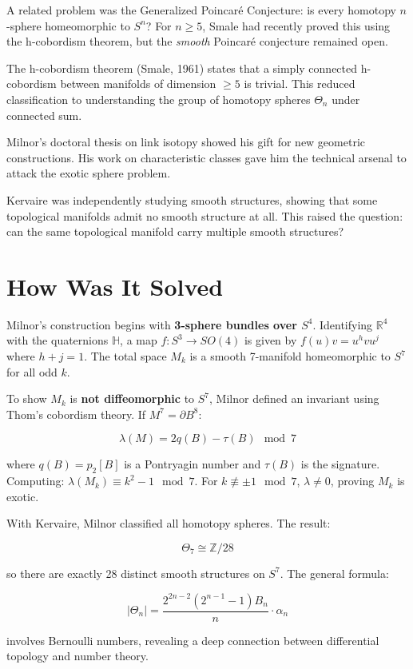 A related problem was the Generalized Poincaré Conjecture: is every homotopy
$n$-sphere homeomorphic to $S^n$? For $n \geq 5$, Smale had recently proved this
using the h-cobordism theorem, but the \emph{smooth} Poincaré conjecture remained
open.

The h-cobordism theorem (Smale, 1961) states that a simply connected h-cobordism
between manifolds of dimension $\geq 5$ is trivial. This reduced classification to
understanding the group of homotopy spheres $\Theta_n$ under connected sum.

Milnor's doctoral thesis on link isotopy showed his gift for new geometric
constructions. His work on characteristic classes gave him the technical arsenal
to attack the exotic sphere problem.

Kervaire was independently studying smooth structures, showing that some
topological manifolds admit no smooth structure at all. This raised the question:
can the same topological manifold carry multiple smooth structures?

\section{How Was It Solved}

Milnor's construction begins with \textbf{3-sphere bundles over $S^4$}. Identifying
$\mathbb{R}^4$ with the quaternions $\mathbb{H}$, a map $f: S^3 \to SO(4)$ is
given by $f(u)v = u^h v u^j$ where $h + j = 1$. The total space $M_k$ is a
smooth 7-manifold homeomorphic to $S^7$ for all odd $k$.

To show $M_k$ is \textbf{not diffeomorphic} to $S^7$, Milnor defined an invariant
using Thom's cobordism theory. If $M^7 = \partial B^8$:

\[\lambda(M) = 2q(B) - \tau(B) \mod 7\]

where $q(B) = p_2[B]$ is a Pontryagin number and $\tau(B)$ is the signature.
Computing: $\lambda(M_k) \equiv k^2 - 1 \mod 7$. For $k \not\equiv \pm 1 \mod 7$,
$\lambda \neq 0$, proving $M_k$ is exotic.

With Kervaire, Milnor classified all homotopy spheres. The result:

\[\Theta_7 \cong \mathbb{Z}/28\]

so there are exactly 28 distinct smooth structures on $S^7$. The general formula:

\[|\Theta_n| = \frac{2^{2n-2}(2^{n-1}-1)B_n}{n} \cdot \alpha_n\]

involves Bernoulli numbers, revealing a deep connection between differential
topology and number theory.

